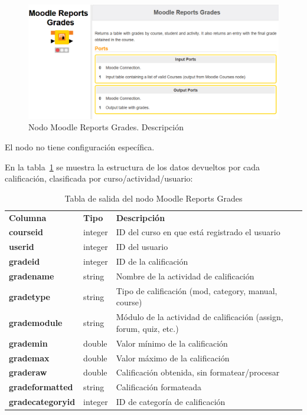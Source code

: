 \begin{figure}[!h]
	\centering
	\includegraphics[width=1\textwidth]{img/nodes_moodle_reports_grades.png}
	\caption{Nodo Moodle Reports Grades. Descripción}
	\label{fig:moodlereportsgrades}
\end{figure}
\FloatBarrier

El nodo no tiene configuración específica. 
\

En la tabla~\ref{tab:moodle_reports_grades_desc} se muestra la estructura de los datos devueltos por cada calificación, clasificada por curso/actividad/usuario: 

\begin{table}[!h]
	\begin{center}
		\begin{tabular}{p{}p{}p{}}
			\toprule
			\textbf{Columna} & \textbf{Tipo} & \textbf{Descripción}\\
			\otoprule
			\textbf{courseid} & integer & ID del curso en que está registrado el usuario \\
         \hline
			\textbf{userid} & integer & ID del usuario \\
         \hline
         \textbf{gradeid} & integer & ID de la calificación \\
         \hline
         \textbf{gradename} & string & Nombre de la actividad de calificación \\
         \hline
         \textbf{gradetype} & string & Tipo de calificación (mod, category, manual, course) \\
         \hline
         \textbf{grademodule} & string & Módulo de la actividad de calificación (assign, forum, quiz, etc.) \\
         \hline
         \textbf{grademin} & double & Valor mínimo de la calificación \\
         \hline
         \textbf{grademax} & double & Valor máximo de la calificación \\
         \hline
         \textbf{graderaw} & double & Calificación obtenida, sin formatear/procesar \\
         \hline
         \textbf{gradeformatted} & string & Calificación formateada \\
         \hline
         \textbf{gradecategoryid} & integer & ID de categoría de calificación \\
         \bottomrule
		\end{tabular}
	\end{center}
	\caption{Tabla de salida del nodo Moodle Reports Grades}
	\label{tab:moodle_reports_grades_desc}
\end{table}
\FloatBarrier

